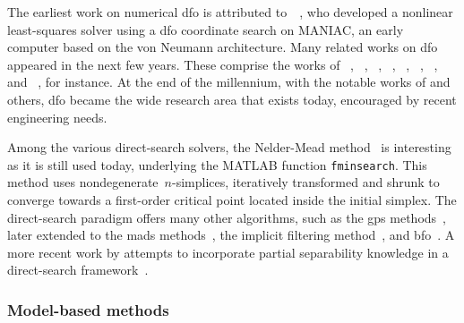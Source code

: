 The earliest work on numerical \gls{dfo} is attributed to~\citeauthor{Fermi_Metropolis_1952}~\cite{Fermi_Metropolis_1952}, who developed a nonlinear least-squares solver using a \gls{dfo} coordinate search on MANIAC, an early computer based on the von Neumann architecture.
Many related works on \gls{dfo} appeared in the next few years.
These comprise the works of \citeauthor{Rosenbrock_1960}~\cite{Rosenbrock_1960}, \citeauthor{Rastrigin_1963}~\cite{Rastrigin_1963}, \citeauthor{Powell_1964}~\cite{Powell_1964,Powell_1975a}, \citeauthor{Matyas_1965}~\cite{Matyas_1965}, \citeauthor{Nelder_Mead_1965}~\cite{Nelder_Mead_1965}, \citeauthor{Fletcher_1965}~\cite{Fletcher_1965}, \citeauthor{Box_1966}~\cite{Box_1966}, and \citeauthor{Karmanov_1974}~\cite{Karmanov_1974}, for instance.
At the end of the millennium, with the notable works of \citeauthor{Wright_1995} and others, \gls{dfo} became the wide research area that exists today, encouraged by recent engineering needs.

Among the various direct-search solvers, the Nelder-Mead method~\cite{Nelder_Mead_1965} is interesting as it is still used today, underlying the MATLAB function \texttt{fminsearch}.
This method uses nondegenerate~$n$-simplices, iteratively transformed and shrunk to converge towards a first-order critical point located inside the initial simplex.
The direct-search paradigm offers many other algorithms, such as the \gls{gps} methods~\cite{Booker_Etal_1999}, later extended to the \gls{mads} methods~\cite{Abramson_Audet_2006,Abramson_Etal_2009,Audet_Dennis_2006,Audet_Dennis_Digabel_2008,Digabel_2011}, the implicit filtering method~\cite{Kelley_2011}, and \gls{bfo}~\cite{Porcelli_Toint_2017}.
A more recent work by \citeauthor{Porcelli_Toint_2021} attempts to incorporate partial separability knowledge in a direct-search framework~\cite{Porcelli_Toint_2021}.

\subsubsection{Model-based methods}

